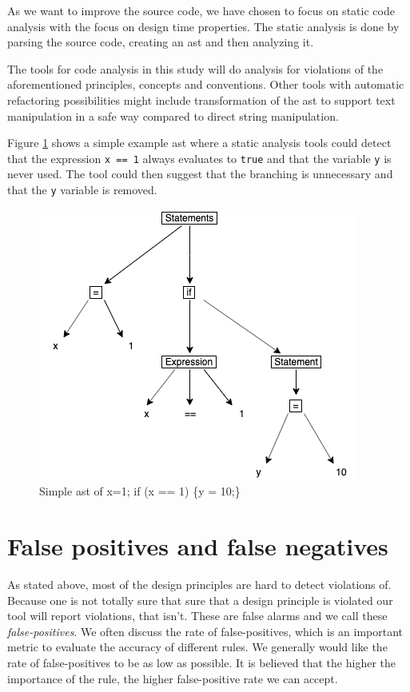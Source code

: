 \documentclass{report}
\begin{document}
As we want to improve the source code, we have chosen to focus on static code analysis with the focus on design time properties. The static analysis is done by parsing the source code, creating an \gls{ast} and then analyzing it.


The tools for code analysis in this study  will do analysis for violations of the aforementioned principles, concepts and conventions. Other tools with automatic refactoring possibilities might include transformation of the \gls{ast} to support text manipulation in a safe way compared to direct string manipulation. 




Figure \ref{fig:ast} shows a simple example \gls{ast} where a static analysis tools could detect that the expression \texttt{x == 1} always evaluates to \texttt{true} and that the variable \texttt{y} is never used. The tool could then suggest that the branching is unnecessary and that the \texttt{y} variable is removed.  

\begin{figure}[h!]
	\centering
	\includegraphics[width=\linewidth/2]{report/images/ast.png}
	\caption{Simple \gls{ast} of x=1; if (x == 1) \{y = 10;\}}
	\label{fig:ast}
\end{figure}



\section{False positives and false negatives}
As stated above, most of the design principles are hard to detect violations of. Because one is not totally sure that sure that a design principle is violated our tool will report violations, that isn't. These are false alarms and we call these \textit{false-positives}. We often discuss the rate of false-positives, which is an important metric to evaluate the accuracy of different rules. We generally would like the rate of false-positives to be as low as possible. It is believed that the higher the importance of the rule, the higher false-positive rate we can accept. 
\end{document}
